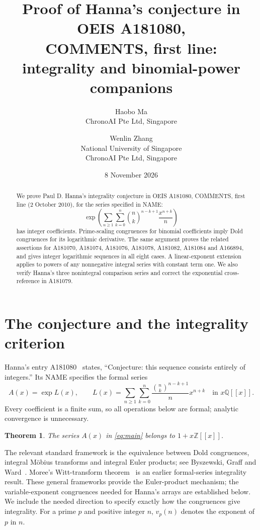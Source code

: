 \documentclass[11pt]{article}
\title{Proof of Hanna's conjecture in OEIS A181080,\\COMMENTS, first line:\\integrality and binomial-power companions}
\author{Haobo Ma\\\small ChronoAI Pte Ltd, Singapore
\and Wenlin Zhang\\\small National University of Singapore\\\small ChronoAI Pte Ltd, Singapore}
\date{8 November 2026}
\newtheorem{theorem}{Theorem}
\newcommand{\Z}{\mathbb Z}
\newcommand{\Q}{\mathbb Q}
\newcommand{\vp}{v_p}
\begin{document}
\maketitle
\begin{abstract}
We prove Paul D. Hanna's integrality conjecture in OEIS A181080,
COMMENTS, first line (2 October 2010), for the series specified in NAME:
\[
 \exp\!\left(\sum_{n\geq1}\sum_{k=0}^n\binom nk^{n-k+1}\frac{x^{n+k}}n\right)
\]
has integer coefficients.
Prime-scaling congruences for binomial coefficients imply Dold congruences for
its logarithmic derivative. The same argument proves the related assertions
for A181070, A181074, A181076, A181078, A181082, A181084 and A166894,
and gives integer logarithmic sequences in all eight cases. A linear-exponent
extension applies to powers of any nonnegative integral series with constant
term one. We also verify Hanna's three nonintegral comparison series and
correct the exponential cross-reference in A181079.
\end{abstract}

\section{The conjecture and the integrality criterion}
Hanna's entry A181080~\cite{H80} states, ``Conjecture: this sequence consists
entirely of integers.'' Its NAME specifies the formal series
\begin{equation}\label{eq:main}
 A(x)=\exp L(x),\qquad
 L(x)=\sum_{n\geq1}\sum_{k=0}^n\frac{\binom nk^{n-k+1}}{n}x^{n+k}
 \quad\text{in }x\Q[[x]].
\end{equation}
Every coefficient is a finite sum, so all operations below are formal;
analytic convergence is unnecessary.
\begin{theorem}\label{thm:main}
The series $A(x)$ in \eqref{eq:main} belongs to $1+x\Z[[x]]$.
\end{theorem}
The relevant standard framework is the equivalence between Dold congruences,
integral M\"obius transforms and integral Euler products; see
Byszewski, Graff and Ward~\cite[Definition 2.1, Theorem 2.5 and Lemma 2.6]{BGW}.
Moree's Witt-transform theorem~\cite[Theorems 2 and 4(2)]{Moree}
is an earlier formal-series integrality result. These general frameworks
provide the Euler-product mechanism; the variable-exponent congruences
needed for Hanna's arrays are established below.
We include the needed direction
to specify exactly how the congruences give integrality.
For a prime $p$ and positive integer $n$, $\vp(n)$ denotes the exponent of $p$ in $n$.
\end{document}
